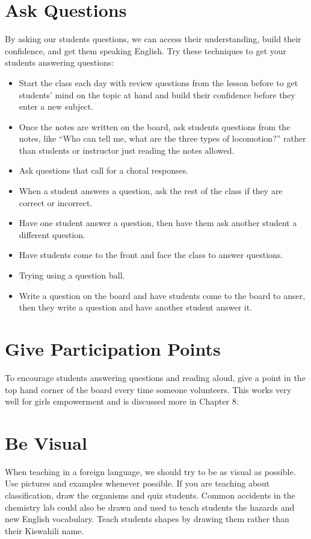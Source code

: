 \section{Ask Questions}
By asking our students questions, we can access their understanding, build their confidence, and get them speaking English. Try these techniques to get your students answering questions:
\begin{itemize}
\item Start the class each day with review questions from the lesson before to get students' mind on the topic at hand and build their confidence before they enter a new subject.
\item Once the notes are written on the board, ask students questions from the notes, like ``Who can tell me, what are the three types of locomotion?'' rather than students or instructor just reading the notes allowed.
\item Ask questions that call for a choral responses.
\item When a student answers a question, ask the rest of the class if they are correct or incorrect.
\item Have one student answer a question, then have them ask another student a different question.
\item Have students come to the front and face the class to answer questions.
\item Trying using a question ball.
\item Write a question on the board and have students come to the board to anser, then they write a question and have another student answer it.
\end{itemize}

\section{Give Participation Points}
To encourage students answering questions and reading aloud, give a point in the top hand corner of the board every time someone volunteers.   This works very well for girls empowerment and is discussed more in Chapter 8.\\

\section{Be Visual}
When teaching in a foreign language, we should try to be as visual as possible.  Use pictures and examples whenever possible.  If you are teaching about classification, draw the organisms and quiz students.  Common accidents in the chemistry lab could also be drawn and used to teach students the hazards and new English vocabulary.   Teach students shapes by drawing them rather than their Kiswahili name.\\ 

